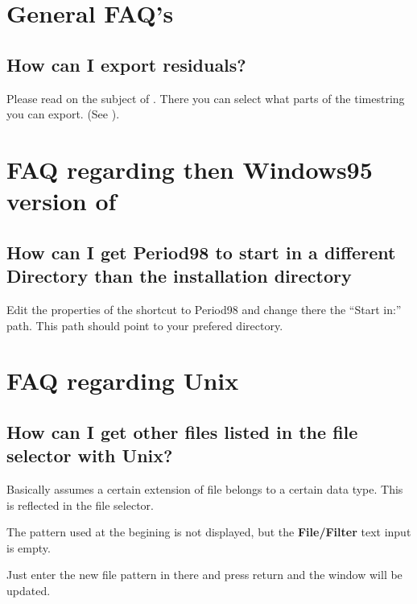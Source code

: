 \section{General FAQ's}

\subsection{How can I export residuals?}
Please read on the subject of 
. 
There you can select what parts of the timestring you can export.
(See ).

\section{FAQ regarding then Windows95 version of \periodname}

\subsection{How can I get Period98 to start in a different Directory than the installation directory}

Edit the properties of the shortcut to Period98 and change there the
``Start in:'' path. This path should point to your prefered directory.


\section{FAQ regarding Unix}

\subsection{How can I get other files listed in the file selector with Unix?}
Basically \period assumes a certain extension of file belongs to a certain
data type. This is reflected in the file selector. 

The pattern used at the begining is not displayed, but the
{\bf File/Filter} text input is empty.

Just enter the new file pattern in there and press return and the
window will be updated.

